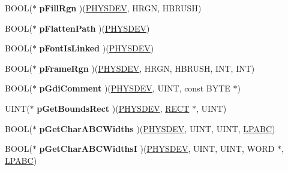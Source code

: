 \begin{DoxyCompactItemize}
\item 
\mbox{\label{structgdi__dc__funcs_adf003b093689233855514bbe3a5dbf39}} 
B\+O\+OL($\ast$ {\bfseries p\+Fill\+Rgn} )(\hyperlink{structgdi__physdev}{P\+H\+Y\+S\+D\+EV}, H\+R\+GN, H\+B\+R\+U\+SH)
\item 
\mbox{\label{structgdi__dc__funcs_a38afed11a363864873d9136c1a83cf53}} 
B\+O\+OL($\ast$ {\bfseries p\+Flatten\+Path} )(\hyperlink{structgdi__physdev}{P\+H\+Y\+S\+D\+EV})
\item 
\mbox{\label{structgdi__dc__funcs_a498b31b529fc1f6be8fc449f4a020221}} 
B\+O\+OL($\ast$ {\bfseries p\+Font\+Is\+Linked} )(\hyperlink{structgdi__physdev}{P\+H\+Y\+S\+D\+EV})
\item 
\mbox{\label{structgdi__dc__funcs_a3ddc55f997862b1ff5808a373be457fa}} 
B\+O\+OL($\ast$ {\bfseries p\+Frame\+Rgn} )(\hyperlink{structgdi__physdev}{P\+H\+Y\+S\+D\+EV}, H\+R\+GN, H\+B\+R\+U\+SH, I\+NT, I\+NT)
\item 
\mbox{\label{structgdi__dc__funcs_a131340a8647c2e1e951d8bb84cbd4faf}} 
B\+O\+OL($\ast$ {\bfseries p\+Gdi\+Comment} )(\hyperlink{structgdi__physdev}{P\+H\+Y\+S\+D\+EV}, U\+I\+NT, const B\+Y\+TE $\ast$)
\item 
\mbox{\label{structgdi__dc__funcs_af6d030e06c54d53f09cd13b9e6ef2d04}} 
U\+I\+NT($\ast$ {\bfseries p\+Get\+Bounds\+Rect} )(\hyperlink{structgdi__physdev}{P\+H\+Y\+S\+D\+EV}, \hyperlink{structtag_r_e_c_t}{R\+E\+CT} $\ast$, U\+I\+NT)
\item 
\mbox{\label{structgdi__dc__funcs_a851285cdf2375971bef9b4538e271539}} 
B\+O\+OL($\ast$ {\bfseries p\+Get\+Char\+A\+B\+C\+Widths} )(\hyperlink{structgdi__physdev}{P\+H\+Y\+S\+D\+EV}, U\+I\+NT, U\+I\+NT, \hyperlink{struct___a_b_c}{L\+P\+A\+BC})
\item 
\mbox{\label{structgdi__dc__funcs_a499fc21c0ca09750176cae308f3e3d49}} 
B\+O\+OL($\ast$ {\bfseries p\+Get\+Char\+A\+B\+C\+WidthsI} )(\hyperlink{structgdi__physdev}{P\+H\+Y\+S\+D\+EV}, U\+I\+NT, U\+I\+NT, W\+O\+RD $\ast$, \hyperlink{struct___a_b_c}{L\+P\+A\+BC})
\item 

\end{DoxyCompactItemize}
